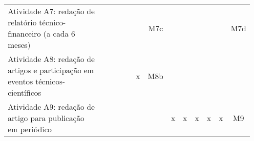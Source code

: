 \begin{table}[h!]
\begin{tabular}{ p{} cccccccccccc}
   Atividade A7: redação de relatório técnico-financeiro (a cada 6 meses)          &    &    &    &    &    & M7c&    &    &    &    &    & M7d\\
   Atividade A8: redação de artigos e participação em eventos técnicos-científicos &    &    &    &    & x  & M8b&    &    &    &    &    &    \\
   Atividade A9: redação de artigo para publicação em periódico                    &    &    &    &    &    &    & x  & x  & x  & x  & x  & M9 \\
\bottomrule
\end{tabular}
	\label{tab:crono}
\end{table}
\clearpage
